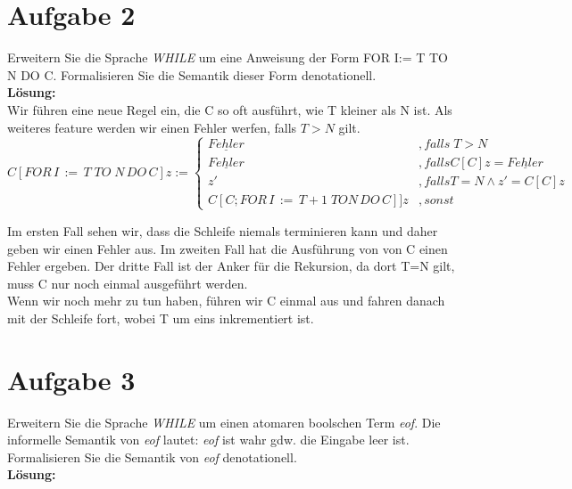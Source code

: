 \documentclass[11pt,a4paper,ngerman]{article}
\begin{document}
\section*{Aufgabe 2}

Erweitern Sie die Sprache \emph{WHILE} um eine Anweisung der Form
{\ttfamily FOR I:= T TO N DO C}. Formalisieren Sie die Semantik 
dieser Form denotationell.\\

\textbf{Lösung:}\\

Wir führen eine neue Regel ein, die C so oft ausführt, wie T kleiner als N ist. Als weiteres
feature werden wir einen Fehler werfen, falls $T>N$ gilt.\\

$$
C[FOR \, I \, := \, T \; TO \; N \, DO \, C]z
:= \left\{\begin{array}{ll}
\underline{Fehler}&, falls \; T>N\\
\underline{Fehler} &, falls C[C]z = \underline{Fehler}\\
z' &, falls T=N \land z'=C[C]z\\
C[C;FOR\, I \, := \, T+1 \; TO N \, DO \, C]]z &, sonst
\end{array}\right.
$$

Im ersten Fall sehen wir, dass die Schleife niemals terminieren kann und daher geben wir einen 
Fehler aus. Im zweiten Fall hat die Ausführung von von C einen Fehler ergeben. Der dritte Fall
ist der Anker für die Rekursion, da dort T=N gilt, muss C nur noch einmal ausgeführt werden.\\
Wenn wir noch mehr zu tun haben, führen wir C einmal aus und fahren danach mit der Schleife fort,
wobei T um eins inkrementiert ist.


\section*{Aufgabe 3}

Erweitern Sie die Sprache \emph{WHILE} um einen atomaren boolschen Term \emph{eof}.
Die informelle Semantik von \emph{eof} lautet: \emph{eof} ist wahr gdw. die Eingabe
leer ist.\\
Formalisieren Sie die Semantik von \emph{eof} denotationell.\\

\textbf{Lösung:}\\
\end{document}
